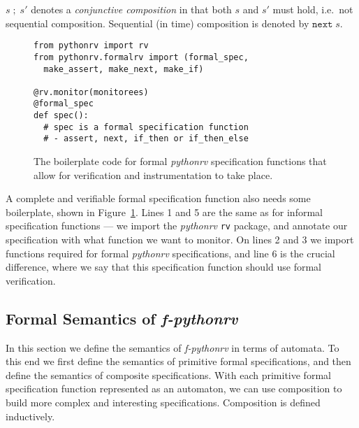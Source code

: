 $s \; ; \; s'$ denotes a \textit{conjunctive composition} in that both
$s$ and $s'$ must hold, i.e.\ not sequential composition. Sequential (in time)
composition is denoted by $\texttt{next} \; s$.


\begin{figure}[h!]
	\begin{center}
	\begin{minipage}{0.7\textwidth}
	\begin{lstlisting}
from pythonrv import rv
from pythonrv.formalrv import (formal_spec,
  make_assert, make_next, make_if)

@rv.monitor(monitorees)
@formal_spec
def spec():
  # spec is a formal specification function
  # - assert, next, if_then or if_then_else
	\end{lstlisting}
	\end{minipage}
	\end{center}

  \caption{The boilerplate code for formal \textit{pythonrv} specification
  functions that allow for verification and instrumentation to take place.}
	\label{figure-formal-boilerplate}
\end{figure}

A complete and verifiable formal specification function also needs some
boilerplate, shown in Figure~\ref{figure-formal-boilerplate}. Lines 1 and 5 are
the same as for informal specification functions --- we import the
\textit{pythonrv} \texttt{rv} package, and annotate our specification with what
function we want to monitor. On lines 2 and 3 we import functions required for
formal \textit{pythonrv} specifications, and line 6 is the crucial difference,
where we say that this specification function should use formal verification.








\subsection{Formal Semantics of \textit{f-pythonrv}}
\label{section-approach-composition}
\lstset{language=Python,numbers=none}

In this section we define the semantics of \textit{f-pythonrv} in terms of
automata. To this end we first define the semantics of primitive
formal specifications, and then define the semantics of composite
specifications. With each primitive formal specification function represented
as an automaton, we can use composition to build more complex and interesting
specifications. Composition is defined inductively.

